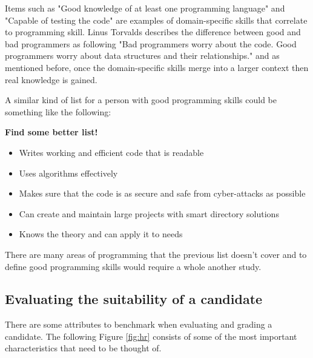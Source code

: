 \documentclass[11pt,a4paper,oneside,article]{memoir}
\begin{document}
Items such as "Good knowledge of at least one programming language" and "Capable of testing the code" are examples of domain-specific skills that correlate to programming skill. Linus Torvalds describes the difference between good and bad programmers as following "Bad programmers worry about the code. Good programmers worry about data structures and their relationships." \cite{torvalds:email} and as mentioned before, once the domain-specific skills merge into a larger context then real knowledge is gained.  

A similar kind of list for a person with good programming skills could be something like the following:

\textbf{Find some better list!}

\vspace{-17pt} 
\begin{itemize}
\item Writes working and efficient code that is readable
\item Uses algorithms effectively
\item Makes sure that the code is as secure and safe from cyber-attacks as possible
\item Can create and maintain large projects with smart directory solutions
\item Knows the theory and can apply it to needs
\end{itemize}
\vspace{-17pt}

There are many areas of programming that the previous list doesn't cover and to define good programming skills would require a whole another study.

\subsection{Evaluating the suitability of a candidate}
\label{sec:evaluating}


There are some attributes to benchmark when evaluating and grading a candidate. The following Figure \vref{fig:hr} consists of some of the most important characteristics that need to be thought of.
\end{document}
